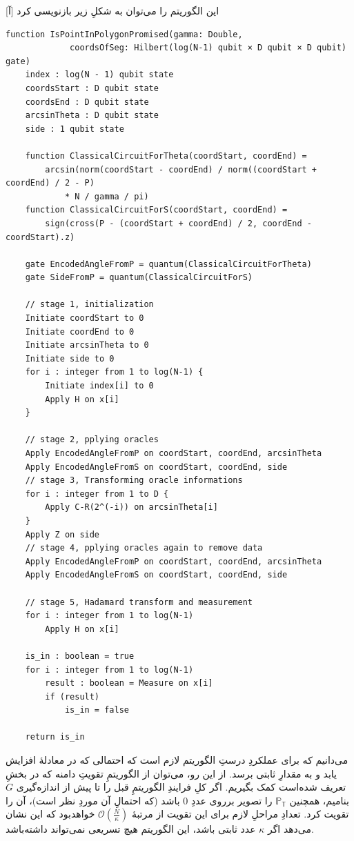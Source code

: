 \documentclass[a4paper,12pt]{article}
\renewcommand{\O}[1]{\mathcal{O}(#1)}
\begin{document}
این الگوریتم را می‌توان به شکلِ زیر بازنویسی کرد
[آ]
\begin{latin}
\begin{lstlisting}
function IsPointInPolygonPromised(gamma: Double,
             coordsOfSeg: Hilbert(log(N-1) qubit × D qubit × D qubit) gate)
    index : log(N - 1) qubit state
    coordsStart : D qubit state
    coordsEnd : D qubit state
    arcsinTheta : D qubit state
    side : 1 qubit state

    function ClassicalCircuitForTheta(coordStart, coordEnd) = 
        arcsin(norm(coordStart - coordEnd) / norm((coordStart + coordEnd) / 2 - P) 
            * N / gamma / pi)
    function ClassicalCircuitForS(coordStart, coordEnd) = 
        sign(cross(P - (coordStart + coordEnd) / 2, coordEnd - coordStart).z)
        
    gate EncodedAngleFromP = quantum(ClassicalCircuitForTheta)
    gate SideFromP = quantum(ClassicalCircuitForS)
    
    // stage 1, initialization
    Initiate coordStart to 0
    Initiate coordEnd to 0
    Initiate arcsinTheta to 0
    Initiate side to 0
    for i : integer from 1 to log(N-1) {
        Initiate index[i] to 0
        Apply H on x[i]
    }
    
    // stage 2, pplying oracles
    Apply EncodedAngleFromP on coordStart, coordEnd, arcsinTheta
    Apply EncodedAngleFromS on coordStart, coordEnd, side
    // stage 3, Transforming oracle informations
    for i : integer from 1 to D {
        Apply C-R(2^(-i)) on arcsinTheta[i]
    }
    Apply Z on side
    // stage 4, pplying oracles again to remove data
    Apply EncodedAngleFromP on coordStart, coordEnd, arcsinTheta
    Apply EncodedAngleFromS on coordStart, coordEnd, side
    
    // stage 5, Hadamard transform and measurement
    for i : integer from 1 to log(N-1)
        Apply H on x[i]
        
    is_in : boolean = true
    for i : integer from 1 to log(N-1)
        result : boolean = Measure on x[i]
        if (result)
            is_in = false

    return is_in
\end{lstlisting}
\end{latin}

می‌دانیم که برای عملکردِ درستِ الگوریتم لازم است که احتمالی که در معادلهٔ  افزایش یابد و به مقدارِ ثابتی برسد. از این رو، می‌توان از الگوریتمِ تقویتِ دامنه که در بخشِ  تعریف شده‌است کمک بگیریم.
اگر کلِ فرایندِ الگوریتمِ قبل را تا پیش از اندازه‌گیری $G$ بنامیم، همچنین 
$\mathbb{P_T}$
را تصویر برروی عددِ $0$ باشد (که احتمالِ آن موردِ نظر است)، آن را تقویت کرد.
تعدادِ مراحلِ لازم برای این تقویت از مرتبهٔ
$\O{\frac{N}{\kappa}}$
خواهدبود که این نشان می‌دهد اگر $\kappa$ عدد ثابتی باشد، این الگوریتم هیچ تسریعی نمی‌تواند داشته‌باشد.
\end{document}

